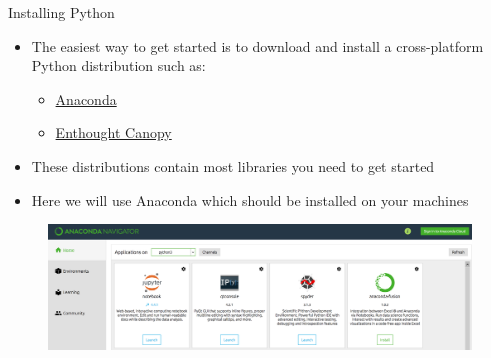 \documentclass[pdf]{beamer}
\begin{document}
\begin{frame}{Installing Python}
\begin{itemize}\addtolength{\itemsep}{0.5\baselineskip}
	\item The easiest way to get started is to download and install a cross-platform Python distribution such as:
	\begin{itemize}
		\item \href{https://www.continuum.io/downloads}{Anaconda}
		\item \href{https://store.enthought.com/downloads/}{Enthought Canopy}
	\end{itemize}
	\item These distributions contain most libraries you need to get started
	\item Here we will use Anaconda which should be installed on your machines
\end{itemize}

\begin{figure}
\includegraphics[width=\textwidth]{anaconda.png}
\end{figure}

\end{frame}

\end{document}
